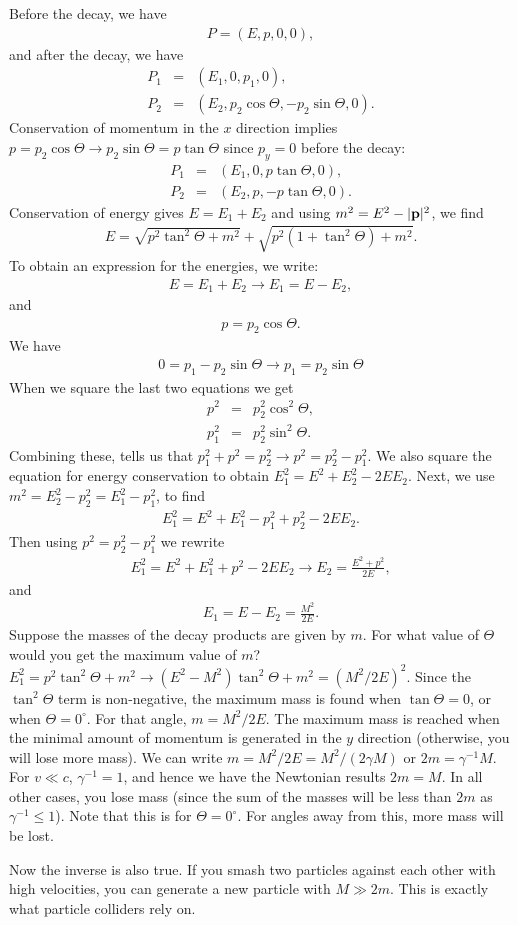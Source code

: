 \documentclass[12pt]{article}
\newcommand{\be}{\begin{eqnarray}}
\newcommand{\ee}{\end{eqnarray}}
\begin{document}
Before the decay, we have 
\be
P = (E,p,0,0),
\ee
and after the decay, we have 
\be
P_1 &=& (E_1,0,p_1,0), \nonumber \\
P_2 &=& (E_2,p_2 \cos \Theta,-p_2 \sin \Theta,0).
\ee
Conservation of momentum in the $x$ direction implies $p = p_2 \cos \Theta \rightarrow p_2\sin \Theta = p \tan \Theta$ since $p_y = 0$ before the decay:
\be
P_1 &=& (E_1,0,p \tan \Theta,0), \nonumber \\
P_2 &=& (E_2,p ,-p \tan \Theta,0). 
\ee
Conservation of energy gives $E = E_1 + E_2$ and using $m^2  = E^2 -|{\bf p}|^2$, we find 
\be
E = \sqrt{p^2\tan^2 \Theta +m^2}+\sqrt{p^2(1+\tan^2 \Theta) +m^2}.
\ee
To obtain an expression for the energies, we write:
\be
E = E_1 + E_2 \rightarrow E_1 = E-E_2,
\ee
and 
\be
p = p_2\cos \Theta.
\ee
We have 
\be
0 = p_1-p_2 \sin \Theta\rightarrow p_1= p_2 \sin \Theta
\ee
When we square the last two equations we get
\be
p^2 &=& p_2^2\cos^2 \Theta \nonumber, \\
p_1^2 &=& p_2^2 \sin^2 \Theta.
\ee
Combining these, tells us that $p_1^2 + p^2 = p_2^2 \rightarrow p^2 = p_2^2 -p_1^2$. We also square the equation for energy conservation to obtain $E_1^2 = E^2+E_2^2 - 2 EE_2$. Next, we use $m^2 = E_2^2-p_2^2 = E_1^2-p_1^2$, to find 
\be
E_1^2 = E^2 + E_1^2-p_1^2+p_2^2-2EE_2.
\ee
Then using $p^2 = p_2^2 -p_1^2$ we rewrite
\be
E_1^2 = E^2 + E_1^2+p^2-2EE_2 \rightarrow E_2 = \frac{E^2 +p^2}{2E},
\ee
and 
\be
E_1 = E-E_2 = \frac{M^2}{2E}.
\ee
Suppose the masses of the decay products are given by $m$. For what value of $\Theta$ would you get the maximum value of $m$? $E_1^2 = p^2 \tan^2\Theta + m^2 \rightarrow (E^2-M^2) \tan^2 \Theta + m^2 = (M^2/2E)^2$. Since the $\tan^2\Theta$ term is non-negative, the maximum mass is found when $\tan \Theta = 0$, or when $\Theta = 0^\circ$. For that angle, $m = M^2/2E$. The maximum mass is reached when the minimal amount of momentum is generated in the $y$ direction (otherwise, you will lose more mass). We can write $m = M^2/2E = M^2/(2\gamma M)$ or $2m = \gamma^{-1}M$. For $v\ll c$, $\gamma^{-1} = 1$, and hence we have the Newtonian results $2m  = M$. In all other cases, you lose mass (since the sum of the masses will be less than $2m$ as $\gamma^{-1}\leq 1$). Note that this is for $\Theta = 0^\circ$. For angles away from this, more mass will be lost. 

Now the inverse is also true. If you smash two particles against each other with high velocities, you can generate a new particle with $M\gg 2m$. This is exactly what particle colliders rely on.
\end{document}
